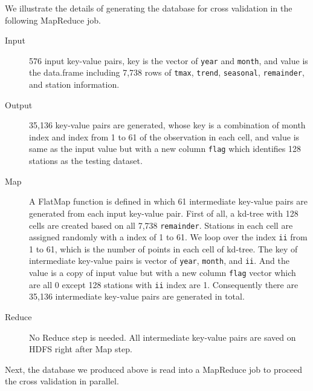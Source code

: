 We illustrate the details of generating the database for cross validation in the
following MapReduce job.

\begin{description}
  \item[Input] 576 input key-value pairs, key is the vector of \texttt{year} and
  \texttt{month}, and value is the data.frame including 7,738 rows of 
  \texttt{tmax}, \texttt{trend}, \texttt{seasonal}, \texttt{remainder}, and
  station information.
  \item[Output] 35,136 key-value pairs are generated, whose key is a combination
  of month index and index from 1 to 61 of the observation in each cell, 
  and value is same as the input value but with a new column \texttt{flag} which
  identifies 128 stations as the testing dataset.
  \item[Map] A FlatMap function is defined in which 61 intermediate key-value
  pairs are generated from each input key-value pair. First of all, a kd-tree with
  128 cells are created based on all 7,738 \texttt{remainder}. Stations in each 
  cell are assigned randomly with a index of 1 to 61. We loop over the index 
  \texttt{ii} from 1 to 61, which is the number of points in each cell of kd-tree. 
  The key of intermediate key-value pairs is vector of \texttt{year},
  \texttt{month}, and \texttt{ii}. And the value is a copy of input value but with
  a new column \texttt{flag} vector which are all 0 except 128 stations with 
  \texttt{ii} index are 1. Consequently there are 35,136 intermediate key-value
  pairs are generated in total.
  \item[Reduce] No Reduce step is needed. All intermediate key-value pairs are
  saved on HDFS right after Map step.
\end{description}

Next, the database we produced above is read into a MapReduce job to proceed the 
cross validation in parallel.

